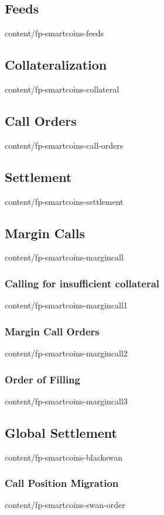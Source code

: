 \documentclass{btswhitepaper}
\begin{document}
\subsection    { Feeds                                            }  { content/fp-smartcoins-feeds       }
\subsection    { Collateralization                                }  { content/fp-smartcoins-collateral  }
\subsection    { Call Orders                                      }  { content/fp-smartcoins-call-orders }
\subsection    { Settlement                                       }  { content/fp-smartcoins-settlement  }

\subsection    { Margin Calls                                     }  { content/fp-smartcoins-margincall  }
\subsubsection { Calling for insufficient collateral              }  { content/fp-smartcoins-margincall1 }
\subsubsection { Margin Call Orders                               }  { content/fp-smartcoins-margincall2 }
\subsubsection { Order of Filling                                 }  { content/fp-smartcoins-margincall3 }

\subsection    { Global Settlement                                }  { content/fp-smartcoins-blackswan   }
\subsubsection { Call Position Migration                          }  { content/fp-smartcoins-swan-order  }
\end{document}
